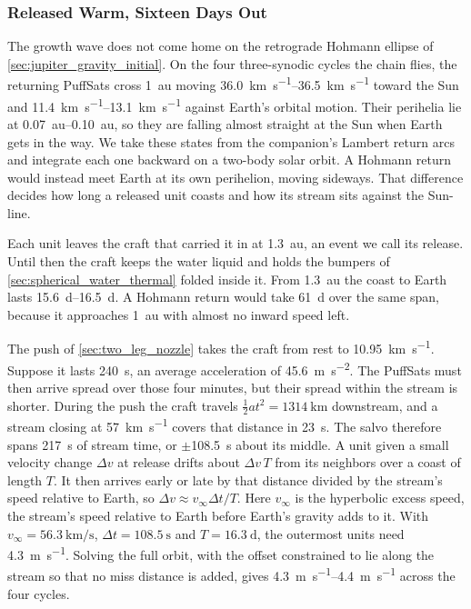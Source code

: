 \documentclass{article}
\newcommand{\deltav}{\Delta v}
\begin{document}
\subsubsection{Released Warm, Sixteen Days Out}\label{sec:growth_wave_release}
The growth wave does not come home on the retrograde Hohmann ellipse of \autoref{sec:jupiter_gravity_initial}. On the four three-synodic cycles the chain flies, the returning PuffSats cross \SI{1}{\astronomicalunit} moving \SIrange{36.0}{36.5}{\kilo\meter\per\second} toward the Sun and \SIrange{11.4}{13.1}{\kilo\meter\per\second} against Earth's orbital motion. Their perihelia lie at \SIrange{0.07}{0.10}{\astronomicalunit}, so they are falling almost straight at the Sun when Earth gets in the way. We take these states from the companion's Lambert return arcs \cite{Katz_aim_is_all_you_need_2025} and integrate each one backward on a two-body solar orbit. A Hohmann return would instead meet Earth at its own perihelion, moving sideways. That difference decides how long a released unit coasts and how its stream sits against the Sun-line.

Each unit leaves the craft that carried it in at \SI{1.3}{\astronomicalunit}, an event we call its release. Until then the craft keeps the water liquid and holds the bumpers of \autoref{sec:spherical_water_thermal} folded inside it. From \SI{1.3}{\astronomicalunit} the coast to Earth lasts \SIrange{15.6}{16.5}{\day}. A Hohmann return would take \SI{61}{\day} over the same span, because it approaches \SI{1}{\astronomicalunit} with almost no inward speed left.

The push of \autoref{sec:two_leg_nozzle} takes the craft from rest to \SI{10.95}{\kilo\meter\per\second}. Suppose it lasts \SI{240}{\second}, an average acceleration of \SI{45.6}{\meter\per\second\squared}. The PuffSats must then arrive spread over those four minutes, but their spread within the stream is shorter. During the push the craft travels $\tfrac{1}{2}at^{2} = \SI{1314}{\kilo\meter}$ downstream, and a stream closing at \SI{57}{\kilo\meter\per\second} covers that distance in \SI{23}{\second}. The salvo therefore spans \SI{217}{\second} of stream time, or $\pm$\SI{108.5}{\second} about its middle. A unit given a small velocity change $\deltav$ at release drifts about $\deltav\,T$ from its neighbors over a coast of length $T$. It then arrives early or late by that distance divided by the stream's speed relative to Earth, so $\deltav \approx v_\infty \Delta t / T$. Here $v_\infty$ is the hyperbolic excess speed, the stream's speed relative to Earth before Earth's gravity adds to it. With $v_\infty = \SI{56.3}{\kilo\meter\per\second}$, $\Delta t = \SI{108.5}{\second}$ and $T = \SI{16.3}{\day}$, the outermost units need \SI{4.3}{\meter\per\second}. Solving the full orbit, with the offset constrained to lie along the stream so that no miss distance is added, gives \SIrange{4.3}{4.4}{\meter\per\second} across the four cycles.
\end{document}
